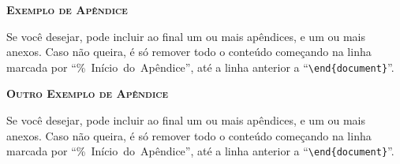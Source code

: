\documentclass[a4paper, 12pt]{ppgeb}
\begin{document}
\clearpage
\begin{flushright}
\end{flushright}

\noindent\begin{large}{\bfseries\scshape Exemplo de Apêndice}\end{large} \label{sec:apendice1}

\vspace{24pt}

Se você desejar, pode incluir ao final um ou mais apêndices, e um ou mais anexos. Caso não queira, é só remover todo o conteúdo começando na linha marcada por ``\%~Início~do~Apêndice'', até a linha anterior a ``\verb|\end{document}|''.

\clearpage
\begin{flushright}
\end{flushright}

\noindent\begin{large}{\bfseries\scshape Outro Exemplo de Apêndice}\end{large} \label{sec:apendice2}

\vspace{24pt}

Se você desejar, pode incluir ao final um ou mais apêndices, e um ou mais anexos. Caso não queira, é só remover todo o conteúdo começando na linha marcada por ``\%~Início~do~Apêndice'', até a linha anterior a ``\verb|\end{document}|''.

\renewcommand{\theanexo}{\Alph{anexo}}
\DeclareRobustCommand{\novoanexo}[1]{%
    \refstepcounter{anexo}%
    \phantom{\theanexo}\label{#1}}
\end{document}
